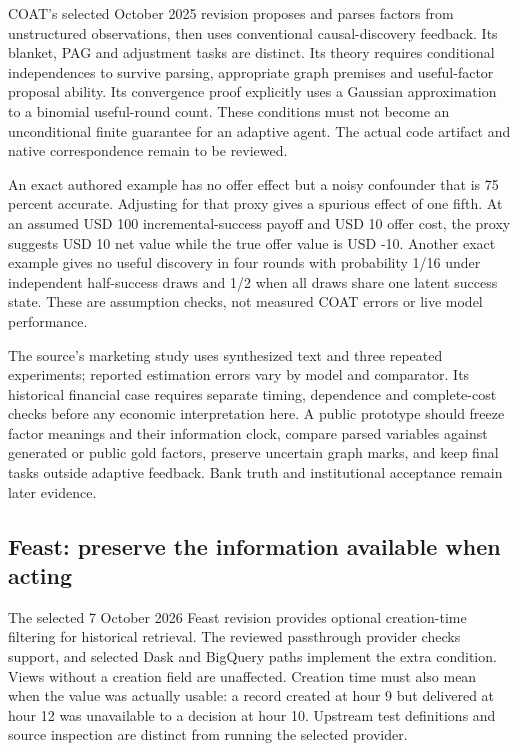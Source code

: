 COAT's selected October 2025 revision proposes and parses factors from
unstructured observations, then uses conventional causal-discovery
feedback. Its blanket, PAG and adjustment tasks are distinct. Its theory
requires conditional independences to survive parsing, appropriate graph
premises and useful-factor proposal ability. Its convergence proof
explicitly uses a Gaussian approximation to a binomial useful-round
count. These conditions must not become an unconditional finite
guarantee for an adaptive agent. The actual code artifact and native
correspondence remain to be reviewed. \citep{exec19_coat}

An exact authored example has no offer effect but a noisy confounder
that is 75 percent accurate. Adjusting for that proxy gives a spurious
effect of one fifth. At an assumed USD 100 incremental-success payoff
and USD 10 offer cost, the proxy suggests USD 10 net value while the
true offer value is USD -10. Another exact example gives no useful
discovery in four rounds with probability 1/16 under independent
half-success draws and 1/2 when all draws share one latent success
state. These are assumption checks, not measured COAT errors or live
model performance. \citep{exec19_coat_reference}

The source's marketing study uses synthesized text and three repeated
experiments; reported estimation errors vary by model and comparator.
Its historical financial case requires separate timing, dependence and
complete-cost checks before any economic interpretation here. A public
prototype should freeze factor meanings and their information clock,
compare parsed variables against generated or public gold factors,
preserve uncertain graph marks, and keep final tasks outside adaptive
feedback. Bank truth and institutional acceptance remain later evidence.
\citep{exec19_coat}

\hypertarget{feast-preserve-the-information-available-when-acting}{%
\subsection{Feast: preserve the information available when
acting}\label{feast-preserve-the-information-available-when-acting}}

The selected 7 October 2026 Feast revision provides optional
creation-time filtering for historical retrieval. The reviewed
passthrough provider checks support, and selected Dask and BigQuery
paths implement the extra condition. Views without a creation field are
unaffected. Creation time must also mean when the value was actually
usable: a record created at hour 9 but delivered at hour 12 was
unavailable to a decision at hour 10. Upstream test definitions and
source inspection are distinct from running the selected provider.
\citep{exec19_feast_source}

